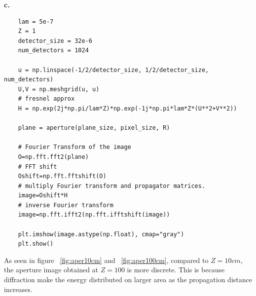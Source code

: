 \documentclass[11pt,a4paper]{article}
\begin{document}
\textbf{c.}
\begin{lstlisting}
    lam = 5e-7
    Z = 1
    detector_size = 32e-6
    num_detectors = 1024
    
    u = np.linspace(-1/2/detector_size, 1/2/detector_size, num_detectors)
    U,V = np.meshgrid(u, u)
    # fresnel approx
    H = np.exp(2j*np.pi/lam*Z)*np.exp(-1j*np.pi*lam*Z*(U**2+V**2)) 
    
    plane = aperture(plane_size, pixel_size, R)

    # Fourier Transform of the image
    O=np.fft.fft2(plane)
    # FFT shift
    Oshift=np.fft.fftshift(O)
    # multiply Fourier transform and propagator matrices.
    image=Oshift*H
    # inverse Fourier transform
    image=np.fft.ifft2(np.fft.ifftshift(image))
    
    plt.imshow(image.astype(np.float), cmap="gray")
    plt.show()
\end{lstlisting}

As seen in figure ~\ref{fig:aper10cm} and ~\ref{fig:aper100cm}, compared to $Z=10cm$, the aperture image obtained at $Z=100$ is more discrete. This is because diffraction make the energy distributed on larger area as the propagation distance increases.
\end{document}
